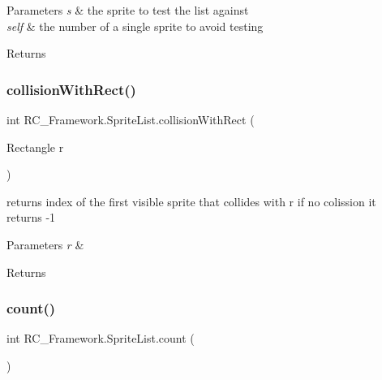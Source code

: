 \begin{DoxyParams}{Parameters}
{\em s} & the sprite to test the list against\\
\hline
{\em self} & the number of a single sprite to avoid testing\\
\hline
\end{DoxyParams}
\begin{DoxyReturn}{Returns}

\end{DoxyReturn}
\mbox{\label{class_r_c___framework_1_1_sprite_list_ac5d904b4fb5a97aadefde7838aea186c}} 
\subsubsection{\texorpdfstring{collision\+With\+Rect()}{collisionWithRect()}}
{\footnotesize\ttfamily int R\+C\+\_\+\+Framework.\+Sprite\+List.\+collision\+With\+Rect (\begin{DoxyParamCaption}\item[{Rectangle}]{r }\end{DoxyParamCaption})}



returns index of the first visible sprite that collides with r if no colission it returns -\/1 


\begin{DoxyParams}{Parameters}
{\em r} & \\
\hline
\end{DoxyParams}
\begin{DoxyReturn}{Returns}

\end{DoxyReturn}
\mbox{\label{class_r_c___framework_1_1_sprite_list_a5ae9a1c4902704af27642541288eab22}} 
\subsubsection{\texorpdfstring{count()}{count()}}
{\footnotesize\ttfamily int R\+C\+\_\+\+Framework.\+Sprite\+List.\+count (\begin{DoxyParamCaption}{ }\end{DoxyParamCaption})}



